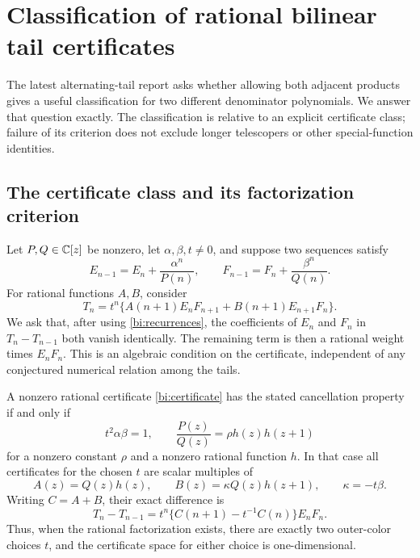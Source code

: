 \section{Classification of rational bilinear tail certificates}
\label{sec:bilinear}

The latest alternating-tail report asks whether allowing both adjacent
products gives a useful classification for two different denominator
polynomials. We answer that question exactly. The classification is
relative to an explicit certificate class; failure of its criterion
does not exclude longer telescopers or other special-function identities.

\subsection{The certificate class and its factorization criterion}

Let $P,Q\in\mathbb C[z]$ be nonzero, let $\alpha,\beta,t\ne0$, and suppose
two sequences satisfy
\begin{equation}\label{bi:recurrences}
 E_{n-1}=E_n+\frac{\alpha^n}{P(n)},\qquad
 F_{n-1}=F_n+\frac{\beta^n}{Q(n)}.
\end{equation}
For rational functions $A,B$, consider
\begin{equation}\label{bi:certificate}
 T_n=t^n\{A(n+1)E_nF_{n+1}+B(n+1)E_{n+1}F_n\}.
\end{equation}
We ask that, after using \eqref{bi:recurrences}, the coefficients of
$E_n$ and $F_n$ in $T_n-T_{n-1}$ both vanish identically. The remaining
term is then a rational weight times $E_nF_n$. This is an algebraic
condition on the certificate, independent of any conjectured numerical
relation among the tails.

\begin{theorem}
\label{bi:classification}
A nonzero rational certificate \eqref{bi:certificate} has the stated
cancellation property if and only if
\begin{equation}\label{bi:criterion}
 t^2\alpha\beta=1,\qquad
 \frac{P(z)}{Q(z)}=\rho h(z)h(z+1)
\end{equation}
for a nonzero constant $\rho$ and a nonzero rational function $h$.
In that case all certificates for the chosen $t$ are scalar multiples
of
\begin{equation}\label{bi:AB}
 A(z)=Q(z)h(z),\qquad B(z)=\kappa Q(z)h(z+1),\qquad
 \kappa=-t\beta.
\end{equation}
Writing $C=A+B$, their exact difference is
\begin{equation}\label{bi:difference}
 T_n-T_{n-1}
   =t^n\{C(n+1)-t^{-1}C(n)\}E_nF_n.
\end{equation}
Thus, when the rational factorization exists, there are exactly two
outer-color choices $t$, and the certificate space for either choice
is one-dimensional.
\end{theorem}

